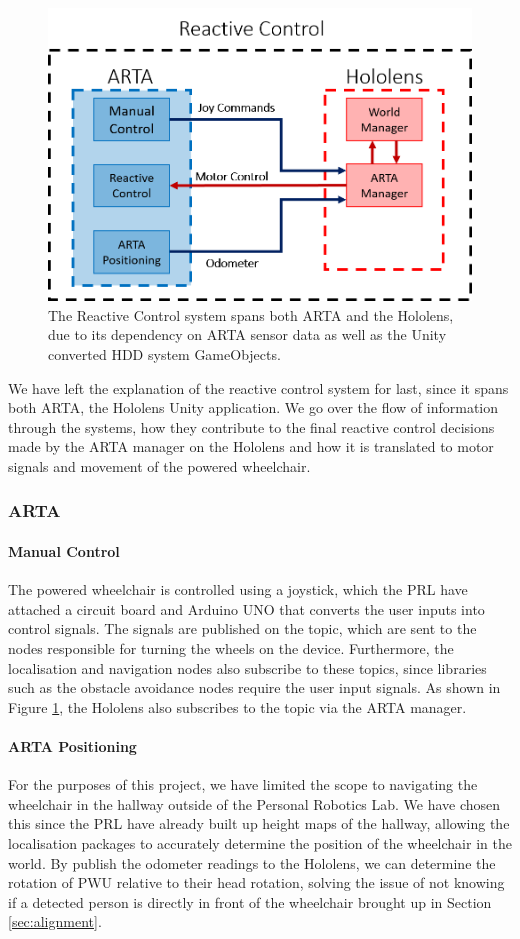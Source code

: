 \begin{figure}[ht]
	\centering
	\includegraphics[width=0.6\linewidth]{img/chapter5_implementation/reactiveControlSystem.png}
	\caption{The Reactive Control system spans both ARTA and the Hololens, due to its dependency on ARTA sensor data as well as the Unity converted HDD system GameObjects.}
	\label{fig:detailedReactive}
\end{figure}

We have left the explanation of the reactive control system for last, since it spans both ARTA, the Hololens Unity application. We go over the flow of information through the systems, how they contribute to the final reactive control decisions made by the ARTA manager on the Hololens and how it is translated to motor signals and movement of the powered wheelchair.

\subsubsection{ARTA}
\paragraph{Manual Control} The powered wheelchair is controlled using a joystick, which the PRL have attached a circuit board and Arduino UNO that converts the user inputs into control signals. The signals are published on the  topic, which are sent to the nodes responsible for turning the wheels on the device. Furthermore, the localisation and navigation nodes also subscribe to these topics, since libraries such as the obstacle avoidance nodes require the user input signals. As shown in Figure \ref{fig:detailedReactive}, the Hololens also subscribes to the topic via the ARTA manager.

\paragraph{ARTA Positioning} For the purposes of this project, we have limited the scope to navigating the wheelchair in the hallway outside of the Personal Robotics Lab. We have chosen this since the PRL have already built up height maps of the hallway, allowing the localisation packages to accurately determine the position of the wheelchair in the world. By publish the odometer readings  to the Hololens, we can determine the rotation of PWU relative to their head rotation, solving the issue of not knowing if a detected person is directly in front of the wheelchair brought up in Section \ref{sec:alignment}.

